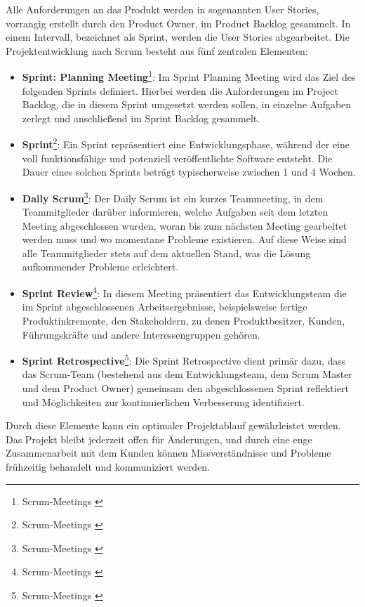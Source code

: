 \noindent Alle Anforderungen an das Produkt werden in sogenannten User Stories, vorrangig erstellt durch den Product
Owner, im Product Backlog gesammelt. In einem Intervall, bezeichnet als Sprint, werden die User Stories abgearbeitet.
Die Projektentwicklung nach Scrum besteht aus fünf zentralen Elementen:
\begin{itemize}
    \item \textbf{Sprint: Planning Meeting}\footnote{Scrum-Meetings \cite{Sprint-planing-meeting}}: Im Sprint Planning
    Meeting wird das Ziel des folgenden Sprints definiert. Hierbei werden die Anforderungen im Project Backlog, die in
    diesem Sprint umgesetzt werden sollen, in einzelne Aufgaben zerlegt und anschließend im Sprint Backlog gesammelt.
    \item \textbf{Sprint}\footnote{Scrum-Meetings \cite{Sprint}}: Ein Sprint repräsentiert eine Entwicklungsphase,
    während der eine voll funktionsfähige und potenziell veröffentlichte Software entsteht. Die Dauer eines solchen
    Sprints beträgt typischerweise zwischen 1 und 4 Wochen.
    \item \textbf{Daily Scrum}\footnote{Scrum-Meetings \cite{Daily-Scrum}}: Der Daily Scrum ist ein kurzes Teammeeting,
    in dem Teammitglieder darüber informieren, welche Aufgaben seit dem letzten Meeting abgeschlossen wurden, woran bis
    zum nächsten Meeting gearbeitet werden muss und wo momentane Probleme existieren. Auf diese Weise sind alle Teammitglieder
    stets auf dem aktuellen Stand, was die Lösung aufkommender Probleme erleichtert.
    \item \textbf{Sprint Review}\footnote{Scrum-Meetings \cite{Sprint-Review}}: In diesem Meeting präsentiert das
    Entwicklungsteam die im Sprint abgeschlossenen Arbeitsergebnisse, beispielsweise fertige Produktinkremente, den
    Stakeholdern, zu denen Produktbesitzer, Kunden, Führungskräfte und andere Interessengruppen gehören.
    \item \textbf{Sprint Retrospective}\footnote{Scrum-Meetings \cite{Sprint-Retroperspektiv}}: Die Sprint Retrospective
    dient primär dazu, dass das Scrum-Team (bestehend aus dem Entwicklungsteam, dem Scrum Master und dem Product Owner)
    gemeinsam den abgeschlossenen Sprint reflektiert und Möglichkeiten zur kontinuierlichen Verbesserung identifiziert.
\end{itemize}

\noindent Durch diese Elemente kann ein optimaler Projektablauf gewährleistet werden. Das Projekt bleibt jederzeit
offen für Änderungen, und durch eine enge Zusammenarbeit mit dem Kunden können Missverständnisse und Probleme
frühzeitig behandelt und kommuniziert werden.

